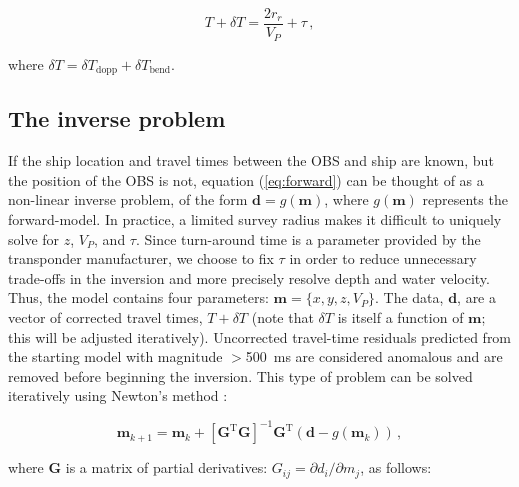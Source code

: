 \begin{equation}
T + \delta T = \frac{2 r_r}{V_P} + \tau \,, \label{eq:forward}
\end{equation}

where $\delta T = \delta T_{\text{dopp}} + \delta T_{\text{bend}}$.

\subsection{The inverse problem}

If the ship location and travel times between the OBS and ship are known, but the position of the OBS is not, equation (\ref{eq:forward}) can be thought of as a non-linear inverse problem, of the form $ \mathbf{d} = g(\mathbf{m})$, where $g(\mathbf{m})$ represents the forward-model. In practice, a limited survey radius makes it difficult to uniquely solve for $z$, $V_P$, and $\tau$. Since turn-around time is a parameter provided by the transponder manufacturer, we choose to fix $\tau$ in order to reduce unnecessary trade-offs in the inversion and more precisely resolve depth and water velocity. Thus, the model contains four parameters: $\mathbf{m} = \{x,y,z,V_P\}$. The data, $\mathbf{d}$, are a vector of corrected travel times, $T+\delta T$ (note that $\delta T$ is itself a function of $\mathbf{m}$; this will be adjusted iteratively). Uncorrected travel-time residuals predicted from the starting model with magnitude $>$500~ms are considered anomalous and are removed before beginning the inversion. This type of problem can be solved iteratively using Newton's method \citep{Menke2018}:

\begin{equation}
	\mathbf{m}_{k+1} = \mathbf{m}_k + \left[\mathbf{G}^{\text{T}} \mathbf{G}\right]^{-1} \mathbf{G}^{\text{T}} \left(\mathbf{d} - g(\mathbf{m}_k)\right) \,,
\end{equation}

where $\mathbf{G}$ is a matrix of partial derivatives: $G_{ij} = \partial d_i/\partial m_j$, as follows:


